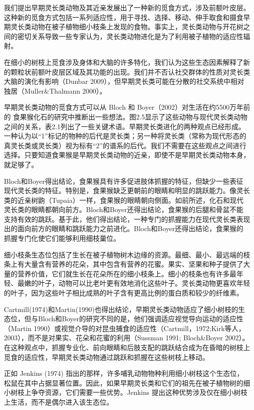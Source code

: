 我们提出早期灵长类动物及其近亲发展出了一种新的觅食方式，涉及前额叶皮层。这种新的觅食方式包括一系列适应性，用于寻找、选择、移动、伸手取食和摄食早期灵长类动物在被子植物细小枝条上发现的食物。事实上，灵长类动物与开花树之间的密切关系导致一些专家认为，灵长类动物进化是为了利用被子植物的适应性辐射。

在细小的树枝上觅食涉及身体和大脑的许多特化，我们认为这些生态因素解释了新的颗粒状前额叶皮层区域及其功能的出现。我们并不否认社交群体的性质对灵长类大脑的演化有影响（Dunbar 2009），但早期灵长类可能在分散的社交系统中相对独居（Muller\&Thalmann 2000）。

早期灵长类动物的觅食方式可以从 Bloch 和 Boyer（2002）对生活在约5500万年前的 食果猴化石的研究中推断出一些想法。图2.5显示了这些动物与现代灵长类动物之间的关系，表2.1列出了一些关键术语。早期灵长类进化的两种观点已经形成。一种认为以“1”标记的物种的后代是灵长类；另一种将灵长类（常称为现代形态的真灵长类或灵长类）视为标有“2”的谱系的后代。我们不需要在这些观点之间进行选择。只要知道食果猴是早期灵长类动物的近亲，即使不是早期灵长类动物本身，就足够了。

Bloch和Boyer得出结论，食果猴具有许多促进肢体抓握的特征，但缺少一些表征现代灵长类的特征。特别是，食果猴缺乏更朝前的眼睛和明显的跳跃能力。像灵长类的近亲树鼩（Tupaia）一样，食果猴的眼睛朝向侧面。如前所述，化石和现代灵长类的眼睛都朝向前方。Bloch和Boyer还得出结论，食果猴的后腿和骨盆不能支持有效的跳跃。基于此，他们得出结论，一种专门的抓握能力在现代灵长类表现出的面向前方的眼睛和跳跃能力之前进化。Bloch和Boyer还得出结论，食果猴的抓握专门化使它们能够利用细枝巢位。

细小枝条生态位包括了生长在被子植物树木边缘的资源。最细、最小、最远端的枝条上有大量含有营养的花朵，其中包含有营养的花蜜。果实、坚果和种子提供了大量的营养价值，它们就生长在花朵所在的细小枝条上。细小的枝条也有许多最年轻、最嫩的叶子，动物可以比老叶更有效地消化这些叶子。灵长类动物更喜欢年轻的叶子，因为这些叶子相比成熟的叶子含有更高比例的蛋白质和较少的纤维素。

Cartmill(1974)和Martin(1990)也得出结论，早期灵长类动物适应了细小树枝的生态位，但与Bloch和Boyer的研究不同的是，他们强调适应视觉导向运动的适应性（Martin 1990）或视觉介导的对昆虫捕食的适应性（Cartmill，1972;Kirk等人，2003），而不是对果实、花朵和花蜜的利用（Sussman 1991; Bloch\&Boyer 2002）。在这种观点中，抓握专业化、前向眼睛和后肢支配的跳跃结合成为在昏暗的树枝上觅食的适应性，早期灵长类动物通过跳跃和抓握在这些树枝上移动。

正如 Jenkins (1974) 指出的那样，许多哺乳动物物种利用细小树枝这个生态位，松鼠在其中占据显著位置。因此，如果早期灵长类和它们的祖先在被子植物树的细小树枝上争夺资源，它们需要一些优势。Jenkins 提出这种优势涉及仅在细小树枝上生活，而不是偶尔进入该生态位。


